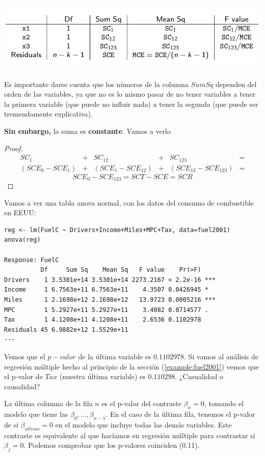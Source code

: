 \begin{center}
\includegraphics[scale=0.4]{img/TablaAnovaGeneral.png}
\end{center}



Es importante darse cuenta que los números de la columna $SumSq$ dependen del orden de las variables, ya que no es lo mismo pasar de no tener variables a tener la primera variable (que puede no influir nada) a tener la segunda (que puede ser tremendamente explicativa).

\textbf{Sin embargo,} la suma es \textbf{constante}. Vamos a verlo
\begin{proof}
\[
\begin{array}{cccccc}
SC_1 &+ &SC_{12} &+ &SC_{123} &= \\
(SCE_0 - SCE_1) &+ &(SCE_1 - SCE_{12}) &+ &(SCE_{12} - SCE_{123})&=\end{array}  \]
\[ SCE_0 - SCE_{123} = SCT - SCE = SCR\]
\end{proof}


\begin{example}
Vamos a ver una tabla anova normal, con los datos del consumo de combustible en EEUU:

\begin{lstlisting}[style=mystyle]
reg <- lm(FuelC ~ Drivers+Income+Miles+MPC+Tax, data=fuel2001)
anova(reg)

Response: FuelC
          Df     Sum Sq    Mean Sq   F value    Pr(>F)
Drivers    1 3.5301e+14 3.5301e+14 2273.2167 < 2.2e-16 ***
Income     1 6.7563e+11 6.7563e+11    4.3507 0.0426945 *
Miles      1 2.1698e+12 2.1698e+12   13.9723 0.0005216 ***
MPC        1 5.2927e+11 5.2927e+11    3.4082 0.0714577 .
Tax        1 4.1208e+11 4.1208e+11    2.6536 0.1102978
Residuals 45 6.9882e+12 1.5529e+11
---
\end{lstlisting}

Vemos que el $p-valor$ de la última variable es $0.1102978$. Si vamos al análisis de regresión múltiple hecho al principio de la sección (\ref{example:fuel2001}) vemos que el p-valor de $Tax$ (nuestra última variable) es $0.110298$. ¿Casualidad o causalidad?

La última columna de la fila $n$ es el p-valor del contraste $β_n = 0$, tomando el modelo que tiene las $β_0,...,β_{n-1}$. En el caso de la última fila, tenemos el p-valor de si $β_{ultimo} = 0$ en el modelo que incluye todas las demás variables. Este contraste es equivalente al que hacíamos en regresión múltiple para contrastar si $β_j = 0$. Podemos comprobar que los p-valores coinciden (0.11).

\end{example}



